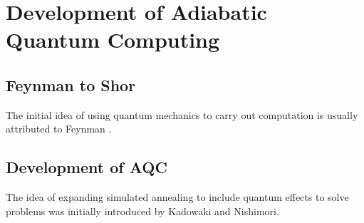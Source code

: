 \chapter{Development of Adiabatic Quantum Computing}
\section{Feynman to Shor}
The initial idea of using quantum mechanics to carry out computation is usually attributed to Feynman \cite{feynman}.
\section{Development of AQC}
The idea of expanding simulated annealing to include quantum effects to solve problems was initially introduced by Kadowaki and Nishimori\cite{transverse}.  
